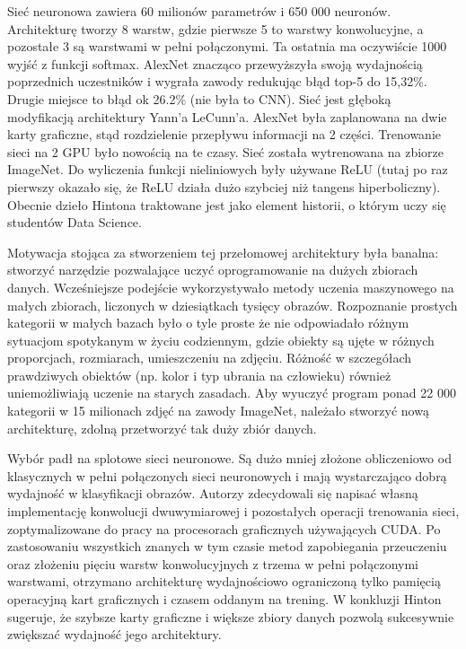 \documentclass[12pt,a4paper,twoside,titlepage,openright]{book}
\begin{document}
 Sieć neuronowa zawiera 60 milionów parametrów i 650 000 neuronów. Architekturę tworzy 8 warstw, gdzie pierwsze 5 to warstwy konwolucyjne, a pozostałe 3 są warstwami w pełni połączonymi. Ta ostatnia ma oczywiście 1000 wyjść z funkcji softmax. AlexNet znacząco przewyższyła swoją wydajnością poprzednich uczestników i wygrała zawody redukując błąd top-5 do 15,32\%. Drugie miejsce to błąd ok 26.2\% (nie była to CNN). Sieć jest głęboką modyfikacją architektury Yann’a LeCunn’a. AlexNet była zaplanowana na dwie karty graficzne, stąd rozdzielenie przepływu informacji na 2 części. Trenowanie sieci na 2 GPU było nowością na te czasy. Sieć została wytrenowana na zbiorze ImageNet. Do wyliczenia funkcji nieliniowych były używane ReLU (tutaj po raz pierwszy okazało się, że ReLU działa dużo szybciej niż tangens hiperboliczny). Obecnie dzieło Hintona traktowane jest jako element historii, o którym uczy się studentów Data Science.
 
 Motywacja stojąca za stworzeniem tej przełomowej architektury była banalna: stworzyć narzędzie pozwalające uczyć oprogramowanie na dużych zbiorach danych.
 Wcześniejsze podejście wykorzystywało metody uczenia maszynowego na małych zbiorach, liczonych w dziesiątkach tysięcy obrazów. Rozpoznanie prostych kategorii w małych bazach było o tyle proste że nie odpowiadało różnym sytuacjom spotykanym w życiu codziennym, gdzie obiekty są ujęte w różnych proporcjach, rozmiarach, umieszczeniu na zdjęciu. Różność w szczegółach prawdziwych obiektów (np. kolor i typ ubrania na człowieku) również uniemożliwiają uczenie na starych zasadach. Aby wyuczyć program ponad 22 000 kategorii w 15 milionach zdjęć na zawody ImageNet, należało stworzyć nową architekturę, zdolną przetworzyć tak duży zbiór danych.
 
 Wybór padł na splotowe sieci neuronowe. Są dużo mniej złożone obliczeniowo od klasycznych w pełni połączonych sieci neuronowych i mają wystarczająco dobrą wydajność w klasyfikacji obrazów. Autorzy zdecydowali się napisać własną implementację konwolucji dwuwymiarowej i pozostałych operacji trenowania sieci, zoptymalizowane do pracy na procesorach graficznych używających CUDA. Po zastosowaniu wszystkich znanych w tym czasie metod zapobiegania przeuczeniu oraz złożeniu pięciu warstw konwolucyjnych z trzema w pełni połączonymi warstwami, otrzymano architekturę wydajnościowo ograniczoną tylko pamięcią operacyjną kart graficznych i czasem oddanym na trening. W konkluzji Hinton sugeruje, że szybsze karty graficzne i większe zbiory danych pozwolą sukcesywnie zwiększać wydajność jego architektury.
 
\end{document}

